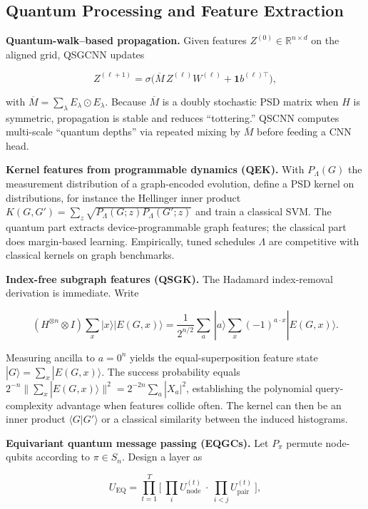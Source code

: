 \documentclass[11pt]{article}
\begin{document}
\subsection{Quantum Processing and Feature Extraction}

\textbf{Quantum-walk--based propagation.} Given features $Z^{(0)}\in\mathbb{R}^{n\times d}$ on the aligned grid, QSGCNN \citep{bai2018qsgcnn} updates

$$
Z^{(\ell+1)}=\sigma\!\big(\overline{M}\, Z^{(\ell)}W^{(\ell)}+ \mathbf{1}b^{(\ell)\!\top}\big),
$$

with $\overline{M}=\sum_\lambda E_\lambda\odot E_\lambda$. Because $\overline{M}$ is a doubly stochastic PSD matrix when $H$ is symmetric, propagation is stable and reduces ``tottering.'' QSCNN\cite{zhang2019qscnn} computes multi-scale ``quantum depths'' via repeated mixing by $\overline{M}$ before feeding a CNN head.

\noindent \textbf{Kernel features from programmable dynamics (QEK).} \citep{henry2021quantum} With $P_\Lambda(G)$ the measurement distribution of a graph-encoded evolution, define a PSD kernel on distributions, for instance the Hellinger inner product $K(G,G')=\sum_{z}\sqrt{P_\Lambda(G;z)P_\Lambda(G';z)}$ and train a classical SVM. The quantum part extracts device-programmable graph features; the classical part does margin-based learning. Empirically, tuned schedules $\Lambda$ are competitive with classical kernels on graph benchmarks.

\noindent \textbf{Index-free subgraph features (QSGK).}\citep{kishi2021qsgk} The Hadamard index-removal derivation is immediate. Write

$$
(H^{\otimes n}\otimes I)\!\sum_x |x\rangle|E(G,x)\rangle=\frac{1}{2^{n/2}}\sum_{a}\,|a\rangle\!\!\sum_{x}(-1)^{a\cdot x}|E(G,x)\rangle.
$$

Measuring ancilla to $a=0^n$ yields the equal-superposition feature state $|G\rangle=\sum_x |E(G,x)\rangle$. The success probability equals $2^{-n}\big\|\sum_x |E(G,x)\rangle\big\|^2=2^{-2n}\sum_a|X_a|^2$, establishing the polynomial query-complexity advantage when features collide often. The kernel can then be an inner product $\langle G|G'\rangle$ or a classical similarity between the induced histograms.

\noindent \textbf{Equivariant quantum message passing (EQGCs).} \citep{mernyei2021eqgc} Let $P_\pi$ permute node-qubits according to $\pi\in S_n$. Design a layer as

$$
U_{\text{EQ}}=\prod_{t=1}^{T}\Big[\ \prod_{i} U^{(t)}_{\text{node}} \ \cdot\  \prod_{i<j} U^{(t)}_{\text{pair}}\ \Big],
$$
\end{document}
